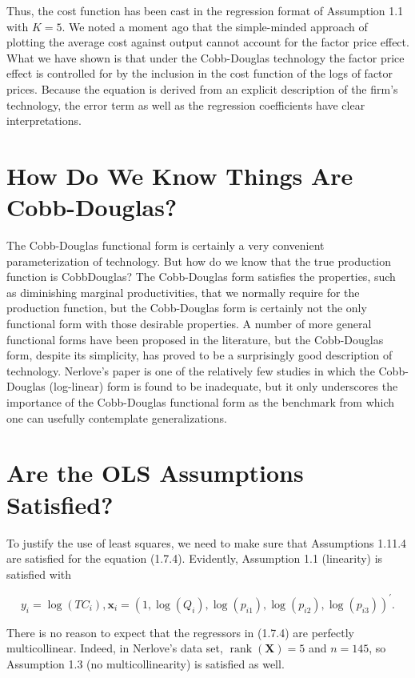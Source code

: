 \documentclass[10pt]{article}
\begin{document}
Thus, the cost function has been cast in the regression format of Assumption 1.1 with $K=5$. We noted a moment ago that the simple-minded approach of plotting the average cost against output cannot account for the factor price effect. What we have shown is that under the Cobb-Douglas technology the factor price effect is controlled for by the inclusion in the cost function of the logs of factor prices. Because the equation is derived from an explicit description of the firm's technology, the error term as well as the regression coefficients have clear interpretations.

\section*{How Do We Know Things Are Cobb-Douglas?}
The Cobb-Douglas functional form is certainly a very convenient parameterization of technology. But how do we know that the true production function is CobbDouglas? The Cobb-Douglas form satisfies the properties, such as diminishing marginal productivities, that we normally require for the production function, but the Cobb-Douglas form is certainly not the only functional form with those desirable properties. A number of more general functional forms have been proposed in the literature, but the Cobb-Douglas form, despite its simplicity, has proved to be a surprisingly good description of technology. Nerlove's paper is one of the relatively few studies in which the Cobb-Douglas (log-linear) form is found to be inadequate, but it only underscores the importance of the Cobb-Douglas functional form as the benchmark from which one can usefully contemplate generalizations.

\section*{Are the OLS Assumptions Satisfied?}
To justify the use of least squares, we need to make sure that Assumptions 1.11.4 are satisfied for the equation (1.7.4). Evidently, Assumption 1.1 (linearity) is satisfied with

$$
y_{i}=\log \left(T C_{i}\right), \mathbf{x}_{i}=\left(1, \log \left(Q_{i}\right), \log \left(p_{i 1}\right), \log \left(p_{i 2}\right), \log \left(p_{i 3}\right)\right)^{\prime} .
$$

There is no reason to expect that the regressors in (1.7.4) are perfectly multicollinear. Indeed, in Nerlove's data set, $\operatorname{rank}(\mathbf{X})=5$ and $n=145$, so Assumption 1.3 (no multicollinearity) is satisfied as well.
\end{document}
